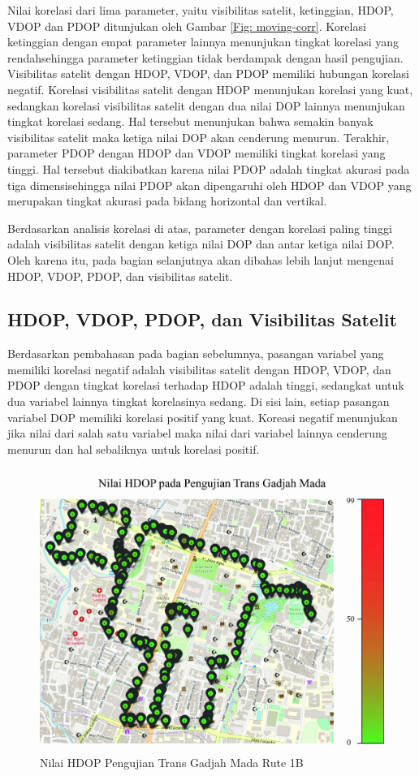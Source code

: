 Nilai korelasi dari lima parameter, yaitu visibilitas satelit, ketinggian, HDOP, VDOP dan PDOP ditunjukan oleh Gambar \ref{Fig: moving-corr}. Korelasi ketinggian dengan empat parameter lainnya menunjukan tingkat korelasi yang rendahsehingga parameter ketinggian tidak berdampak dengan hasil pengujian.  Visibilitas satelit dengan HDOP, VDOP, dan PDOP memiliki hubungan korelasi negatif. Korelasi visibilitas satelit dengan HDOP menunjukan korelasi yang kuat, sedangkan korelasi visibilitas satelit dengan dua nilai DOP lainnya menunjukan tingkat korelasi sedang. Hal tersebut menunjukan bahwa semakin banyak visibilitas satelit maka ketiga nilai DOP akan cenderung menurun. Terakhir, parameter PDOP dengan HDOP dan VDOP memiliki tingkat korelasi yang tinggi. Hal tersebut diakibatkan karena nilai PDOP adalah tingkat akurasi pada tiga dimensisehingga nilai PDOP akan dipengaruhi oleh HDOP dan VDOP yang merupakan tingkat akurasi pada bidang horizontal dan vertikal.

Berdasarkan analisis korelasi di atas, parameter dengan korelasi paling tinggi adalah visibilitas satelit dengan ketiga nilai DOP dan antar ketiga nilai DOP. Oleh karena itu, pada bagian selanjutnya akan dibahas lebih lanjut mengenai HDOP, VDOP, PDOP, dan visibilitas satelit. 

\subsection{HDOP, VDOP, PDOP, dan Visibilitas Satelit}

Berdasarkan pembahasan pada bagian sebelumnya, pasangan variabel yang memiliki korelasi negatif adalah visibilitas satelit dengan HDOP, VDOP, dan PDOP dengan tingkat korelasi terhadap HDOP adalah tinggi, sedangkat untuk dua variabel lainnya tingkat korelasinya sedang. Di sisi lain, setiap pasangan variabel DOP memiliki korelasi positif yang kuat. Koreasi negatif menunjukan jika nilai dari salah satu variabel maka nilai dari variabel lainnya cenderung menurun dan hal sebaliknya untuk korelasi positif.

\begin{figure}[H]
	\centering
	\includegraphics[width=12cm]{contents/chapter-4/pengujian-bergerak/moving-HDOP.jpg}
	\caption{Nilai HDOP Pengujian Trans Gadjah Mada Rute 1B}
	\label{Fig: moving-hdop}
\end{figure}

